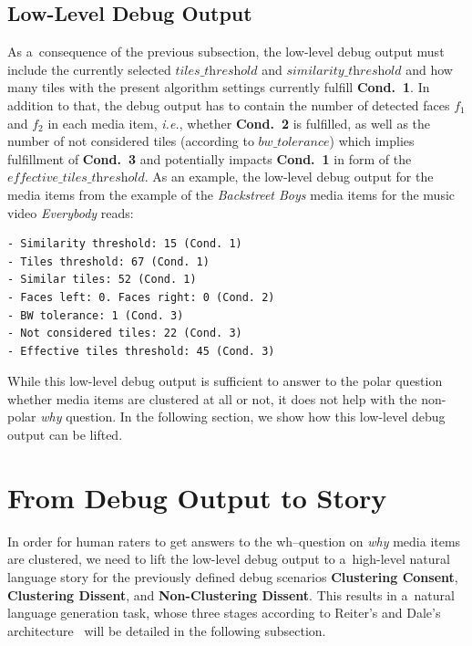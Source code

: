 \documentclass{article}
\begin{document}
\subsection{Low-Level Debug Output}
\label{sec:low-level-debug-output}
As a~consequence of the previous subsection, the low-level debug output must include the currently selected $\textit{tiles\_threshold}$ and $\textit{similarity\_threshold}$ and how many tiles with the present algorithm settings currently fulfill \textbf{Cond.~1}. In addition to that, the debug output has to contain the number of detected faces $f_1$ and $f_2$ in each media item, \emph{i.e.}, whether \textbf{Cond.~2} is fulfilled, as well as the number of
not considered tiles (according to $\textit{bw\_tolerance}$) which implies fulfillment of \textbf{Cond.~3} and potentially impacts \textbf{Cond.~1} in form of the $\textit{effective\_tiles\_threshold}$. As an example, the low-level debug output for the media items from the example of the \emph{Backstreet Boys} media items for the music video \emph{Everybody} reads:
\begin{verbatim}
- Similarity threshold: 15 (Cond. 1)
- Tiles threshold: 67 (Cond. 1)
- Similar tiles: 52 (Cond. 1)
- Faces left: 0. Faces right: 0 (Cond. 2)
- BW tolerance: 1 (Cond. 3)
- Not considered tiles: 22 (Cond. 3)
- Effective tiles threshold: 45 (Cond. 3)
\end{verbatim}

While this low-level debug output is sufficient to answer to the polar question whether media items are clustered at all or not, it does not help with the non-polar \emph{why} question. In the following section, we show how this low-level debug output can be lifted.


\section{From Debug Output to Story}
\label{sec:from-debug-output-to-story}

In order for human raters to get answers to the wh--question
on \emph{why} media items are clustered,
we need to lift the low-level debug output
to a~high-level natural language story
for the previously defined debug scenarios
\textbf{Clustering Consent}, \textbf{Clustering Dissent},
and \textbf{Non-Clustering Dissent}.
This results in a~natural language generation task,
whose three stages according to Reiter's and Dale's architecture~%
\cite{reiter2000building} will be detailed in the following subsection.
\end{document}

